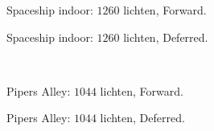 \begin{figure}[t]
  \begin{adjustbox}{minipage=\textwidth, scale=0.6}
    \begin{subfigure}[b]{0.83\textwidth}
      \centering
      \def\svgwidth{\textwidth}
      
      \caption{Spaceship indoor: $1260$ lichten, Forward.}
      \label{fig:hs-exec-resolution-forward:indoor}
    \end{subfigure}
  \end{adjustbox} %
  \begin{adjustbox}{minipage=\textwidth, scale=0.6}
    \begin{subfigure}[b]{0.83\textwidth}
      \centering
      \def\svgwidth{\textwidth}
      
      \caption{Spaceship indoor: $1260$ lichten, Deferred.}
      \label{fig:hs-exec-resolution-deferred:indoor}
    \end{subfigure}
  \end{adjustbox} \\
  \begin{adjustbox}{minipage=\textwidth, scale=0.6}
    \begin{subfigure}[b]{0.83\textwidth}
      \centering
      \def\svgwidth{\textwidth}
      
      \caption{Pipers Alley: $1044$ lichten, Forward.}
      \label{fig:hs-exec-resolution-forward:alley}
    \end{subfigure}
  \end{adjustbox} %
  \begin{adjustbox}{minipage=\textwidth, scale=0.6}
    \begin{subfigure}[b]{0.83\textwidth}
      \centering
      \def\svgwidth{\textwidth}
      
      \caption{Pipers Alley: $1044$ lichten, Deferred.}
      \label{fig:hs-exec-resolution-deferred:alley}
    \end{subfigure}
  \end{adjustbox} \\
  \begin{adjustbox}{minipage=\textwidth, scale=0.6}
    \begin{subfigure}[b]{0.83\textwidth}
      \centering
      \def\svgwidth{\textwidth}
      

\end{subfigure}
\end{adjustbox}
\end{figure}
